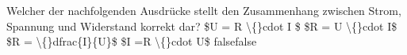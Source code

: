     {Welcher der nachfolgenden Ausdrücke stellt den Zusammenhang zwischen Strom, Spannung und Widerstand korrekt dar?}
    {\$U = R \textbackslash\{\}cdot I \$}
    {\$R = U \textbackslash\{\}cdot I\$}
    {\$R = \textbackslash\{\}dfrac\{I\}\{U\}\$}
    {\$I =R \textbackslash\{\}cdot U\$}
    {false}{false}